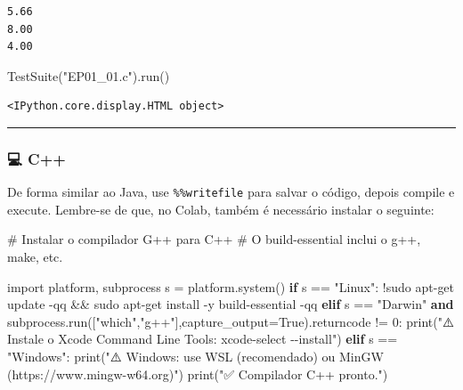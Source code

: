 \documentclass[
  portuguese,
  letterpaper,
  openany,
  oneside,
  12pt,
  a4paper]{book}
\newenvironment{Shaded}{\begin{snugshade}}{\end{snugshade}}
\newcommand{\BuiltInTok}[1]{\textcolor[rgb]{0.00,0.23,0.31}{#1}}
\newcommand{\CommentTok}[1]{\textcolor[rgb]{0.37,0.37,0.37}{#1}}
\newcommand{\ControlFlowTok}[1]{\textcolor[rgb]{0.00,0.23,0.31}{\textbf{#1}}}
\newcommand{\DecValTok}[1]{\textcolor[rgb]{0.68,0.00,0.00}{#1}}
\newcommand{\ImportTok}[1]{\textcolor[rgb]{0.00,0.46,0.62}{#1}}
\newcommand{\KeywordTok}[1]{\textcolor[rgb]{0.00,0.23,0.31}{\textbf{#1}}}
\newcommand{\NormalTok}[1]{\textcolor[rgb]{0.00,0.23,0.31}{#1}}
\newcommand{\OperatorTok}[1]{\textcolor[rgb]{0.37,0.37,0.37}{#1}}
\newcommand{\StringTok}[1]{\textcolor[rgb]{0.13,0.47,0.30}{#1}}
\newcommand{\VariableTok}[1]{\textcolor[rgb]{0.07,0.07,0.07}{#1}}
\begin{document}
\begin{verbatim}
5.66
8.00
4.00
\end{verbatim}

\begin{Shaded}
\begin{Highlighting}[]
\NormalTok{TestSuite(}\StringTok{"EP01\_01.c"}\NormalTok{).run()}
\end{Highlighting}
\end{Shaded}

\begin{verbatim}
<IPython.core.display.HTML object>
\end{verbatim}

\begin{center}\rule{0.5\linewidth}{0.5pt}\end{center}

\subsubsection{💻 C++}\label{c-1}

De forma similar ao Java, use \texttt{\%\%writefile} para salvar o
código, depois compile e execute. Lembre-se de que, no Colab, também é
necessário instalar o seguinte:

\begin{Shaded}
\begin{Highlighting}[]
\CommentTok{\# Instalar o compilador G++ para C++}
\CommentTok{\# O build{-}essential inclui o g++, make, etc.}

\ImportTok{import}\NormalTok{ platform, subprocess}
\NormalTok{s }\OperatorTok{=}\NormalTok{ platform.system()}
\ControlFlowTok{if}\NormalTok{ s }\OperatorTok{==} \StringTok{"Linux"}\NormalTok{:}
    \OperatorTok{!}\NormalTok{sudo apt}\OperatorTok{{-}}\NormalTok{get update }\OperatorTok{{-}}\NormalTok{qq }\OperatorTok{\&\&}\NormalTok{ sudo apt}\OperatorTok{{-}}\NormalTok{get install }\OperatorTok{{-}}\NormalTok{y build}\OperatorTok{{-}}\NormalTok{essential }\OperatorTok{{-}}\NormalTok{qq}
\ControlFlowTok{elif}\NormalTok{ s }\OperatorTok{==} \StringTok{"Darwin"} \KeywordTok{and}\NormalTok{ subprocess.run([}\StringTok{"which"}\NormalTok{,}\StringTok{"g++"}\NormalTok{],capture\_output}\OperatorTok{=}\VariableTok{True}\NormalTok{).returncode }\OperatorTok{!=} \DecValTok{0}\NormalTok{:}
    \BuiltInTok{print}\NormalTok{(}\StringTok{"⚠️ Instale o Xcode Command Line Tools: xcode{-}select {-}{-}install"}\NormalTok{)}
\ControlFlowTok{elif}\NormalTok{ s }\OperatorTok{==} \StringTok{"Windows"}\NormalTok{:}
    \BuiltInTok{print}\NormalTok{(}\StringTok{"⚠️ Windows: use WSL (recomendado) ou MinGW (https://www.mingw{-}w64.org)"}\NormalTok{)}
\BuiltInTok{print}\NormalTok{(}\StringTok{"✅ Compilador C++ pronto."}\NormalTok{)}
\end{Highlighting}
\end{Shaded}
\end{document}
